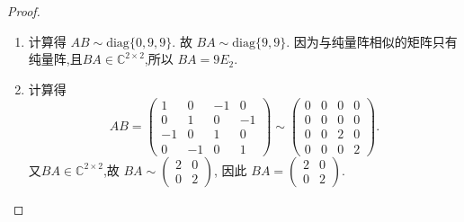 \documentclass[../../main.tex]{subfiles}%
\begin{document}
\begin{proof}
\begin{enumerate}
\item 计算得 \( AB \sim \text{diag}\{0, 9, 9\} \). 故 \( BA \sim \text{diag}\{9, 9\} \). 因为与纯量阵相似的矩阵只有纯量阵,且$BA\in \mathbb{C}^{2\times 2}$,所以 \( BA = 9E_2 \).

\item 计算得
\[
AB = \begin{pmatrix}
1 & 0 & -1 & 0 \\
0 & 1 & 0 & -1 \\
-1 & 0 & 1 & 0 \\
0 & -1 & 0 & 1
\end{pmatrix} \sim \begin{pmatrix}
0 & 0 & 0 & 0 \\
0 & 0 & 0 & 0 \\
0 & 0 & 2 & 0 \\
0 & 0 & 0 & 2
\end{pmatrix}.
\]
又$BA\in \mathbb{C}^{2\times 2}$,故 \( BA \sim \begin{pmatrix} 2 & 0 \\ 0 & 2 \end{pmatrix} \), 因此 \( BA = \begin{pmatrix} 2 & 0 \\ 0 & 2 \end{pmatrix} \).
\end{enumerate}
\end{proof}
\end{document}

